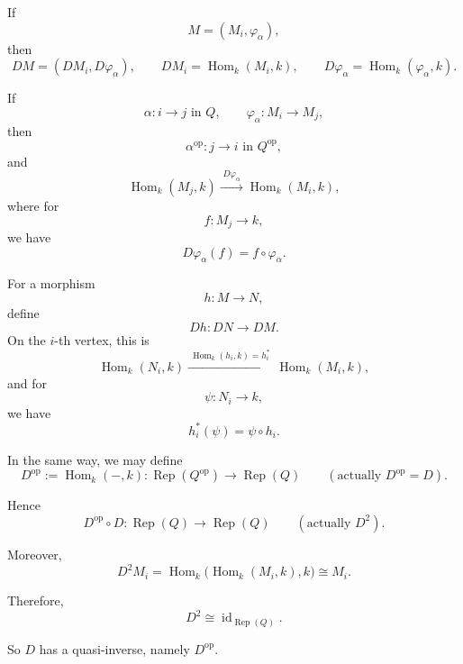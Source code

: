 \documentclass[11pt, a4paper]{report}
\begin{document}
    If
    \[
    M=(M_i,\varphi_\alpha),
    \]
    then
    \[
    DM=(DM_i, D\varphi_{\alpha}),
    \qquad
    DM_i=\operatorname{Hom}_k(M_i,k),
    \qquad
    D\varphi_{\alpha}=\operatorname{Hom}_k(\varphi_\alpha,k).
    \]

    If
    \[
    \alpha:i\to j \text{ in } Q,
    \qquad
    \varphi_\alpha:M_i\to M_j,
    \]
    then
    \[
    \alpha^{\operatorname{op}}:j\to i \text{ in } Q^{\operatorname{op}},
    \]
    and
    \[
    \operatorname{Hom}_k(M_j,k)
    \xrightarrow{\;D\varphi_{\alpha}\;}
    \operatorname{Hom}_k(M_i,k),
    \]
    where for
    \[
    f:M_j\to k,
    \]
    we have
    \[
    D\varphi_{\alpha}(f)=f\circ \varphi_\alpha.
    \]

    For a morphism
    \[
    h:M\to N,
    \]
    define
    \[
    Dh:DN\to DM.
    \]
    On the \(i\)-th vertex, this is
    \[
    \operatorname{Hom}_k(N_i,k)
    \xrightarrow{\;\operatorname{Hom}_k(h_i,k)=h_i^*\;}
    \operatorname{Hom}_k(M_i,k),
    \]
    and for
    \[
    \psi:N_i\to k,
    \]
    we have
    \[
    h_i^*(\psi)=\psi\circ h_i.
    \]

    In the same way, we may define
\[
D^{\operatorname{op}}:=\operatorname{Hom}_k(-,k):
\operatorname{Rep}(Q^{\operatorname{op}})\to \operatorname{Rep}(Q)
\qquad
(\text{actually } D^{\operatorname{op}}=D).
\]

Hence
\[
D^{\operatorname{op}}\circ D:
\operatorname{Rep}(Q)\to \operatorname{Rep}(Q)
\qquad
(\text{actually } D^2).
\]

Moreover,
\[
D^2 M_i
=
\operatorname{Hom}_k\bigl(\operatorname{Hom}_k(M_i,k),k\bigr)
\cong M_i.
\]

Therefore,
\[
D^2 \cong \operatorname{id}_{\operatorname{Rep}(Q)}.
\]

So \(D\) has a quasi-inverse, namely \(D^{\operatorname{op}}\).
\end{document}

